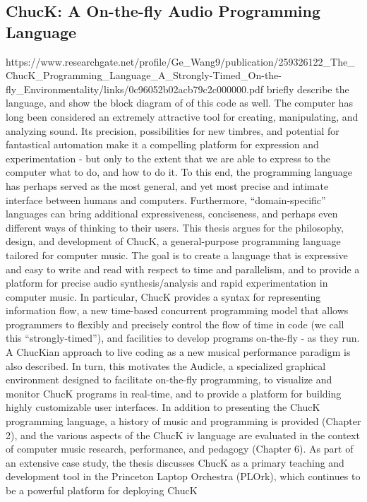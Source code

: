 \subsection{ChucK: A On-the-fly Audio Programming Language}
https://www.researchgate.net/profile/Ge_Wang9/publication/259326122_The_ChucK_Programming_Language_A_Strongly-Timed_On-the-fly_Environmentality/links/0c96052b02acb79c2c000000.pdf
briefly describe the language, and show the block diagram of of this code as well. 
The computer has long been considered an extremely attractive tool for creating,
manipulating, and analyzing sound. Its precision, possibilities for new timbres, and
potential for fantastical automation make it a compelling platform for expression
and experimentation - but only to the extent that we are able to express to the
computer what to do, and how to do it. To this end, the programming language
has perhaps served as the most general, and yet most precise and intimate interface
between humans and computers. Furthermore, “domain-specific” languages can
bring additional expressiveness, conciseness, and perhaps even different ways of
thinking to their users.
This thesis argues for the philosophy, design, and development of ChucK, a
general-purpose programming language tailored for computer music. The goal is to
create a language that is expressive and easy to write and read with respect to time
and parallelism, and to provide a platform for precise audio synthesis/analysis and
rapid experimentation in computer music. In particular, ChucK provides a syntax
for representing information flow, a new time-based concurrent programming model
that allows programmers to flexibly and precisely control the flow of time in code (we
call this “strongly-timed”), and facilities to develop programs on-the-fly - as they
run. A ChucKian approach to live coding as a new musical performance paradigm is
also described. In turn, this motivates the Audicle, a specialized graphical environment 
designed to facilitate on-the-fly programming, to visualize and monitor ChucK
programs in real-time, and to provide a platform for building highly customizable
user interfaces.
In addition to presenting the ChucK programming language, a history of music
and programming is provided (Chapter 2), and the various aspects of the ChucK
iv
language are evaluated in the context of computer music research, performance,
and pedagogy (Chapter 6). As part of an extensive case study, the thesis discusses
ChucK as a primary teaching and development tool in the Princeton Laptop Orchestra 
(PLOrk), which continues to be a powerful platform for deploying ChucK
